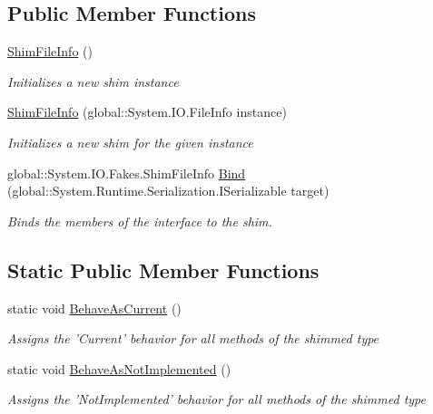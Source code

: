 \subsection*{Public Member Functions}
\begin{DoxyCompactItemize}
\item 
\hyperlink{class_system_1_1_i_o_1_1_fakes_1_1_shim_file_info_aa970f7f5717805b13e7010945e8e508e}{Shim\-File\-Info} ()
\begin{DoxyCompactList}\small\item\em Initializes a new shim instance\end{DoxyCompactList}\item 
\hyperlink{class_system_1_1_i_o_1_1_fakes_1_1_shim_file_info_a293d32c42cc21897acb64311852ca857}{Shim\-File\-Info} (global\-::\-System.\-I\-O.\-File\-Info instance)
\begin{DoxyCompactList}\small\item\em Initializes a new shim for the given instance\end{DoxyCompactList}\item 
global\-::\-System.\-I\-O.\-Fakes.\-Shim\-File\-Info \hyperlink{class_system_1_1_i_o_1_1_fakes_1_1_shim_file_info_ae75c228e13b215137e741437940a19b4}{Bind} (global\-::\-System.\-Runtime.\-Serialization.\-I\-Serializable target)
\begin{DoxyCompactList}\small\item\em Binds the members of the interface to the shim.\end{DoxyCompactList}\end{DoxyCompactItemize}
\subsection*{Static Public Member Functions}
\begin{DoxyCompactItemize}
\item 
static void \hyperlink{class_system_1_1_i_o_1_1_fakes_1_1_shim_file_info_aec259f70445c9971fca134ff328323f0}{Behave\-As\-Current} ()
\begin{DoxyCompactList}\small\item\em Assigns the 'Current' behavior for all methods of the shimmed type\end{DoxyCompactList}\item 
static void \hyperlink{class_system_1_1_i_o_1_1_fakes_1_1_shim_file_info_a04c7a2b5f38df9f0fdaf39be80a6826c}{Behave\-As\-Not\-Implemented} ()
\begin{DoxyCompactList}\small\item\em Assigns the 'Not\-Implemented' behavior for all methods of the shimmed type\end{DoxyCompactList}\end{DoxyCompactItemize}
